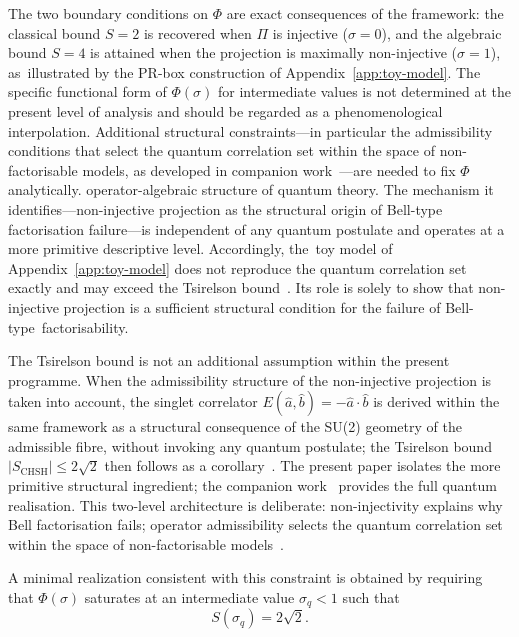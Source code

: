 \documentclass[11pt,a4paper]{article}
\theoremstyle{remark}
\begin{document}
  The two boundary conditions on $\Phi$ are exact consequences of the framework:
  the classical bound $S = 2$ is recovered when $\Pi$ is injective ($\sigma = 0$),
  and the algebraic bound $S = 4$ is attained when the projection is maximally
  non-injective ($\sigma = 1$), as~illustrated by the PR-box construction of
  Appendix~\ref{app:toy-model}.
  The specific functional form of $\Phi(\sigma)$ for intermediate values is not
  determined at the present level of analysis and should be regarded as a
  phenomenological interpolation.
  Additional structural constraints---in particular the admissibility conditions
  that select the quantum correlation set within the space of non-factorisable models,
  as developed in companion work~\cite{Q1}---are needed to fix $\Phi$ analytically.
  operator-algebraic structure of quantum theory.
  The mechanism it identifies---non-injective projection as the structural origin of
  Bell-type factorisation failure---is independent of any quantum postulate and operates
  at a more primitive descriptive level.
  Accordingly, the~toy model of Appendix~\ref{app:toy-model} does not reproduce the quantum correlation
  set exactly and may exceed the Tsirelson bound~\cite{Tsirelson1980}.
  Its role is solely to show that non-injective projection is a sufficient structural
  condition for the failure of Bell-type~factorisability.

  The Tsirelson bound is not an additional assumption within the present programme.
  When the admissibility structure of the non-injective projection is taken into account,
  the singlet correlator $E(\hat{a}, \hat{b}) = -\hat{a} \cdot \hat{b}$ is derived within
  the same framework as a structural consequence of the SU(2) geometry of the admissible fibre,
  without invoking any quantum postulate; the Tsirelson bound
  $|S_\mathrm{CHSH}| \le 2\sqrt{2}$ then follows as a corollary~\cite{Q1}.
  The present paper isolates the more primitive structural ingredient; the companion
  work~\cite{Q1} provides the full quantum realisation.
  This two-level architecture is deliberate: non-injectivity explains why Bell
  factorisation fails; operator admissibility selects the quantum correlation set
  within the space of non-factorisable models~\cite{Brunner2014}.

  A minimal realization consistent with this constraint is obtained by requiring that
  $\Phi(\sigma)$ saturates at an intermediate value $\sigma_q < 1$ such that
\begin{equation}
    S(\sigma_q) = 2\sqrt{2}.
  \end{equation}
\end{document}
